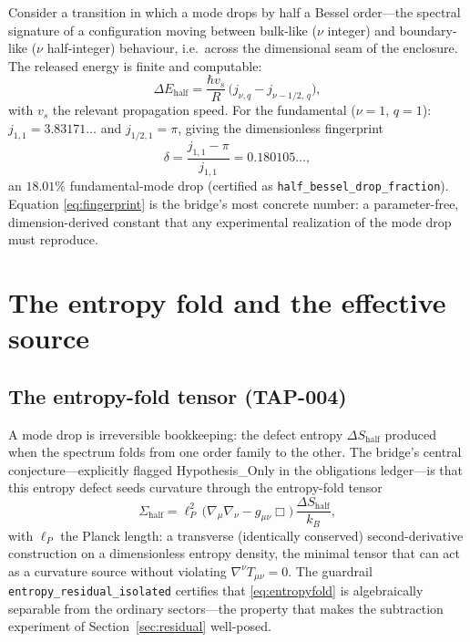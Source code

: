 \documentclass[11pt]{article}
\theoremstyle{remark}
\begin{document}
Consider a transition in which a mode drops by half a Bessel order---the spectral signature of a configuration moving between bulk-like ($\nu$ integer) and boundary-like ($\nu$ half-integer) behaviour, i.e.\ across the dimensional seam of the enclosure. The released energy is finite and computable:
\begin{equation}
\Delta E_{\mathrm{half}} = \frac{\hbar v_s}{R}\, \big( j_{\nu,q} - j_{\nu - 1/2,\, q} \big),
\label{eq:halfdrop}
\end{equation}
with $v_s$ the relevant propagation speed. For the fundamental ($\nu = 1$, $q = 1$): $j_{1,1} = 3.83171\ldots$ and $j_{1/2,1} = \pi$, giving the dimensionless fingerprint
\begin{equation}
\delta = \frac{j_{1,1} - \pi}{j_{1,1}} = 0.180105\ldots,
\label{eq:fingerprint}
\end{equation}
an $18.01\%$ fundamental-mode drop (certified as \texttt{half\_bessel\_drop\_fraction}). Equation \eqref{eq:fingerprint} is the bridge's most concrete number: a parameter-free, dimension-derived constant that any experimental realization of the mode drop must reproduce.

\section{The entropy fold and the effective source}
\label{sec:entropy}

\subsection{The entropy-fold tensor (TAP-004)}

A mode drop is irreversible bookkeeping: the defect entropy $\Delta S_{\mathrm{half}}$ produced when the spectrum folds from one order family to the other. The bridge's central conjecture---explicitly flagged Hypothesis\_Only in the obligations ledger---is that this entropy defect seeds curvature through the entropy-fold tensor
\begin{equation}
\Sigma_{\mathrm{half}} = \ell_P^2\, \big( \nabla_\mu \nabla_\nu - g_{\mu\nu}\Box \big)\, \frac{\Delta S_{\mathrm{half}}}{k_B},
\label{eq:entropyfold}
\end{equation}
with $\ell_P$ the Planck length: a transverse (identically conserved) second-derivative construction on a dimensionless entropy density, the minimal tensor that can act as a curvature source without violating $\nabla^\nu T_{\mu\nu} = 0$. The guardrail \texttt{entropy\_residual\_isolated} certifies that \eqref{eq:entropyfold} is algebraically separable from the ordinary sectors---the property that makes the subtraction experiment of Section~\ref{sec:residual} well-posed.
\end{document}
